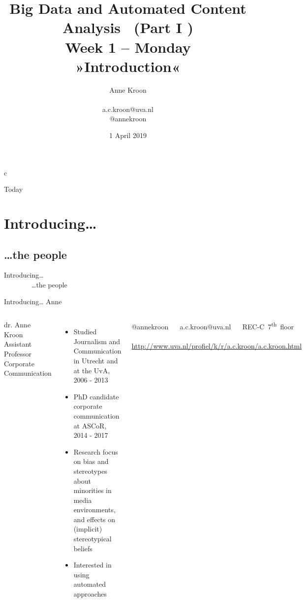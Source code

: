c

\title[Big Data and Automated Content Analysis]{\textbf{Big Data and Automated Content Analysis  \ (Part I )} \\ Week 1 -- Monday  \\ »Introduction«}
\author[Anne Kroon]{Anne Kroon \\ ~ \\ \footnotesize{a.c.kroon@uva.nl \\@annekroon} \\}
\date{1 April 2019}


\begin{frame}{}
\titlepage
\end{frame}

\begin{frame}{Today}
\tableofcontents
\end{frame}

\section{Introducing\ldots}
\subsection{\ldots the people}

\begin{frame} 
	Introducing\ldots \\
	~~~~~~~~\ldots the people
\end{frame}


\begin{frame}{Introducing\ldots} {\huge{Anne}} \small{} 
	\begin{columns}[]    dr. Anne Kroon \\ 
Assistant Professor Corporate Communication
 \begin{itemize} 
 	\item Studied Journalism and Communication in Utrecht
 	and at the UvA,  2006 - 2013
 	\item PhD candidate corporate communication at ASCoR, 2014 - 2017
 	\item Research focus on bias and stereotypes about minorities in media environments, and effects on (implicit) stereotypical beliefs
 	\item Interested in using automated approaches
 \end{itemize} @annekroon ~~ a.c.kroon@uva.nl  ~~ REC-C~7\textsuperscript{th}~floor ~~ \url{http://www.uva.nl/profiel/k/r/a.c.kroon/a.c.kroon.html} 
\end{columns} \end{frame}

